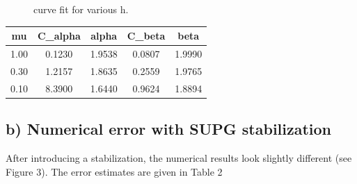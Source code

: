 \documentclass{article}
\begin{document}
\begin{figure}
\centering
  \hfill
  \caption{curve fit for various h.}
\end{figure}





\begin{center}
 \begin{tabular}{||c c c c c||}
 \hline
mu & C_{alpha} & alpha & C_{beta} & beta \\ [0.5ex]
\hline\hline
1.00 & 0.1230 & 1.9538 & 0.0807 & 1.9990 \\
\hline
0.30 & 1.2157 & 1.8635 & 0.2559 & 1.9765 \\
\hline
0.10 & 8.3900 & 1.6440 & 0.9624 & 1.8894 \\
\hline
\end{tabular}
\end{center}

\subsection*{b) Numerical error with SUPG stabilization}
After introducing a stabilization, the numerical results look slightly different (see Figure 3). The error estimates are given in Table 2
\end{document}
